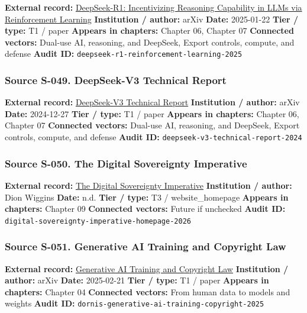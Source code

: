 \documentclass[
  american,
  11pt,
  letterpaper,
]{article}
\begin{document}
\textbf{External record:}
\href{https://arxiv.org/abs/2501.12948}{DeepSeek-R1: Incentivizing
Reasoning Capability in LLMs via Reinforcement Learning}
\textbf{Institution / author:} arXiv \textbf{Date:} 2025-01-22
\textbf{Tier / type:} T1 / paper \textbf{Appears in chapters:} Chapter
06, Chapter 07 \textbf{Connected vectors:} Dual-use AI, reasoning, and
DeepSeek, Export controls, compute, and defense \textbf{Audit ID:}
\texttt{deepseek-r1-reinforcement-learning-2025}

\subsubsection{Source S-049. DeepSeek-V3 Technical
Report}\label{source-s-049-deepseek-v3-technical-report}

\textbf{External record:}
\href{https://arxiv.org/abs/2412.19437}{DeepSeek-V3 Technical Report}
\textbf{Institution / author:} arXiv \textbf{Date:} 2024-12-27
\textbf{Tier / type:} T1 / paper \textbf{Appears in chapters:} Chapter
06, Chapter 07 \textbf{Connected vectors:} Dual-use AI, reasoning, and
DeepSeek, Export controls, compute, and defense \textbf{Audit ID:}
\texttt{deepseek-v3-technical-report-2024}

\subsubsection{Source S-050. The Digital Sovereignty
Imperative}\label{source-s-050-the-digital-sovereignty-imperative}

\textbf{External record:}
\href{https://digitalsovereigntyimperative.com/}{The Digital Sovereignty
Imperative} \textbf{Institution / author:} Dion Wiggins \textbf{Date:}
n.d. \textbf{Tier / type:} T3 / website\_homepage \textbf{Appears in
chapters:} Chapter 09 \textbf{Connected vectors:} Future if unchecked
\textbf{Audit ID:} \texttt{digital-sovereignty-imperative-homepage-2026}

\subsubsection{Source S-051. Generative AI Training and Copyright
Law}\label{source-s-051-generative-ai-training-and-copyright-law}

\textbf{External record:}
\href{https://arxiv.org/abs/2502.15858}{Generative AI Training and
Copyright Law} \textbf{Institution / author:} arXiv \textbf{Date:}
2025-02-21 \textbf{Tier / type:} T1 / paper \textbf{Appears in
chapters:} Chapter 04 \textbf{Connected vectors:} From human data to
models and weights \textbf{Audit ID:}
\texttt{dornis-generative-ai-training-copyright-2025}
\end{document}

